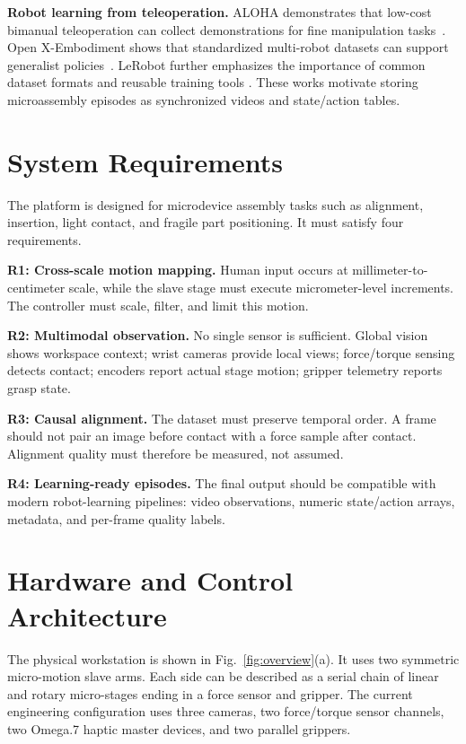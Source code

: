 \documentclass[10pt,twocolumn,letterpaper]{article}
\begin{document}
\textbf{Robot learning from teleoperation.}
ALOHA demonstrates that low-cost bimanual teleoperation can collect
demonstrations for fine manipulation tasks~\cite{zhao2023aloha}. Open
X-Embodiment shows that standardized multi-robot datasets can support
generalist policies~\cite{oneill2024openx}. LeRobot further emphasizes
the importance of common dataset formats and reusable training tools
\cite{cadene2026lerobot}. These works motivate storing microassembly
episodes as synchronized videos and state/action tables.

\section{System Requirements}
The platform is designed for microdevice assembly tasks such as
alignment, insertion, light contact, and fragile part positioning. It
must satisfy four requirements.

\textbf{R1: Cross-scale motion mapping.}
Human input occurs at millimeter-to-centimeter scale, while the slave
stage must execute micrometer-level increments. The controller must
scale, filter, and limit this motion.

\textbf{R2: Multimodal observation.}
No single sensor is sufficient. Global vision shows workspace context;
wrist cameras provide local views; force/torque sensing detects contact;
encoders report actual stage motion; gripper telemetry reports grasp
state.

\textbf{R3: Causal alignment.}
The dataset must preserve temporal order. A frame should not pair an
image before contact with a force sample after contact. Alignment
quality must therefore be measured, not assumed.

\textbf{R4: Learning-ready episodes.}
The final output should be compatible with modern robot-learning
pipelines: video observations, numeric state/action arrays, metadata,
and per-frame quality labels.

\section{Hardware and Control Architecture}
The physical workstation is shown in Fig.~\ref{fig:overview}(a). It
uses two symmetric micro-motion slave arms. Each side can be described
as a serial chain of linear and rotary micro-stages ending in a force
sensor and gripper. The current engineering configuration uses three
cameras, two force/torque sensor channels, two Omega.7 haptic master
devices, and two parallel grippers.
\end{document}
